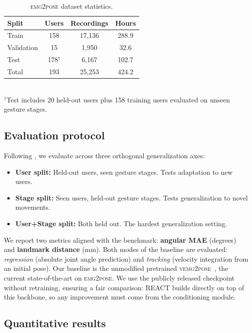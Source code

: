 \documentclass[10pt]{article}
\begin{document}
\begin{table}[h]
\centering
\caption{\textsc{emg2pose} dataset statistics.}
\label{tab:dataset}
\small
\begin{tabular}{lccc}
\toprule
\textbf{Split} & \textbf{Users} & \textbf{Recordings} & \textbf{Hours} \\
\midrule
Train & 158 & 17{,}136 & 288.9 \\
Validation & 15 & 1{,}950 & 32.6 \\
Test & 178$^\dagger$ & 6{,}167 & 102.7 \\
\midrule
Total & 193 & 25{,}253 & 424.2 \\
\bottomrule
\end{tabular}
\\[3pt]
{\footnotesize $^\dagger$Test includes 20 held-out users plus 158 training users evaluated on unseen gesture stages.}
\end{table}

\subsection{Evaluation protocol}
\label{sec:eval_protocol}

Following \citet{salter2024emg2pose}, we evaluate across three orthogonal generalization axes:
\begin{itemize}[leftmargin=*,itemsep=1pt,topsep=2pt]
    \item \textbf{User split:} Held-out users, seen gesture stages. Tests adaptation to new users.
    \item \textbf{Stage split:} Seen users, held-out gesture stages. Tests generalization to novel movements.
    \item \textbf{User+Stage split:} Both held out. The hardest generalization setting.
\end{itemize}

We report two metrics aligned with the benchmark: \textbf{angular MAE} (degrees) and \textbf{landmark distance} (mm). Both modes of the baseline are evaluated: \emph{regression} (absolute joint angle prediction) and \emph{tracking} (velocity integration from an initial pose). Our baseline is the unmodified pretrained \textsc{vemg2pose}~\citep{salter2024emg2pose}, the current state-of-the-art on \textsc{emg2pose}. We use the publicly released checkpoint without retraining, ensuring a fair comparison: REACT builds directly on top of this backbone, so any improvement must come from the conditioning module.

\subsection{Quantitative results}
\label{sec:main_results}
\end{document}
